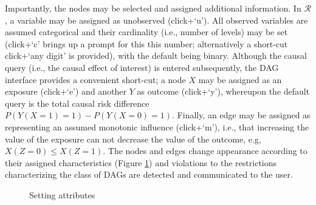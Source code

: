 Importantly, the nodes may be selected and assigned additional information. In \(\mathcal{R}\), a variable may be assigned as unobserved (click+`u'). All observed variables are assumed categorical and their cardinality (i.e., number of levels) may be set (click+`c' brings up a prompt for this this number; alternatively a short-cut click+`any digit' is provided), with the default being binary. Although the causal query (i.e., the causal effect of interest) is entered subsequently, the DAG interface provides a convenient short-cut; a node \(X\) may be assigned as an exposure (click+`e') and another \(Y\) as outcome (click+`y'), whereupon the default query is the total causal risk difference \(P(Y(X=1)=1)-P(Y(X=0)=1)\). Finally, an edge may be assigned as representing an assumed monotonic influence (click+`m'), i.e., that increasing the value of the exposure can not decrease the value of the outcome, e.g, \(X(Z=0)\le X(Z=1)\). The nodes and edges change appearance according to their assigned characteristics (Figure \ref{fig:Cardinality}) and violations to the restrictions characterizing the class of DAGs are detected and communicated to the user.

\begin{figure}
\caption{Setting attributes}\label{fig:Cardinality}
\end{figure}

